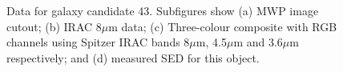 \documentclass[times,usenatbib]{mn2e}
\begin{document}
\begin{figure}
\begin{center}
\caption{Data for galaxy candidate 43. Subfigures show (a) MWP image cutout; (b) IRAC 8$\mu$m data; (c) Three-colour composite with RGB channels using Spitzer IRAC bands 8$\mu$m, 4.5$\mu$m and 3.6$\mu$m respectively; and (d) measured SED for this object.}
\label{gal43}
\end{center}
\end{figure} 
\end{document}
